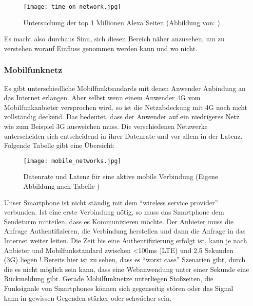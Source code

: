 		\begin{figure}[htbp]
			\begin{center}
				\texttt{[image: time\_on\_network.jpg]}
				\caption{Untersuchung der top 1 Millionen Alexa Seiten (Abbildung von: \autocite{alexa})}
				\label{fig:time_on_network}
			\end{center}
		\end{figure}

		Es macht also durchaus Sinn, sich diesen Bereich näher anzusehen, um zu verstehen worauf Einfluss genommen werden kann und wo nicht.


		\subsubsection{Mobilfunknetz} %
		\label{ssub:Mobilfunknetz}
			Es gibt unterschiedliche Mobilfunktsandards mit denen Anwender Anbindung an das Internet erlangen. Aber selbst wenn einem Anwender 4G vom Mobilfunkanbieter versprochen wird, so ist die Netzabdeckung mit 4G noch nicht vollständig deckend. Das bedeutet, dass der Anwender auf ein niedrigeres Netz wie zum Beispiel 3G ausweichen muss. Die verschiedenen Netzwerke unterscheiden sich entscheidend in ihrer Datenrate und vor allem in der Latenz. Folgende Tabelle gibt eine Übersicht:

			\begin{figure}[htbp]
				\begin{center}
					\texttt{[image: mobile\_networks.jpg]}
					\caption{Datenrate und Latenz für eine aktive mobile Verbindung (Eigene Abbildung nach Tabelle \autocite{grigorikGNetwork})}
					\label{fig:mobile_networks}
				\end{center}
			\end{figure}

			Unser Smartphone ist nicht ständig mit dem "`wireless service provider"' verbunden. Ist eine erste Verbindung nötig, so muss das Smartphone dem Sendeturm mitteilen, dass es Kommunizieren möchte. Der Anbieter muss die Anfrage Authentifizieren, die Verbindung herstellen und dann die Anfrage in das Internet weiter leiten. Die Zeit bis eine Authentifizierung erfolgt ist, kann je nach Anbieter und Mobilfunkstandard zwischen <100ms (LTE) und 2,5 Sekunden (3G) liegen \autocite{grigorikRadio}! Bereits hier ist zu sehen, dass es "`worst case"' Szenarien gibt, durch die es nicht möglich sein kann, dass eine Webanwendung unter einer Sekunde eine Rückmeldung gibt. Gerade Mobilfunknetze unterliegen Stoßzeiten, die Funksignale von Smartphones können sich gegenseitig stören oder das Signal kann in gewissen Gegenden stärker oder schwächer sein.

